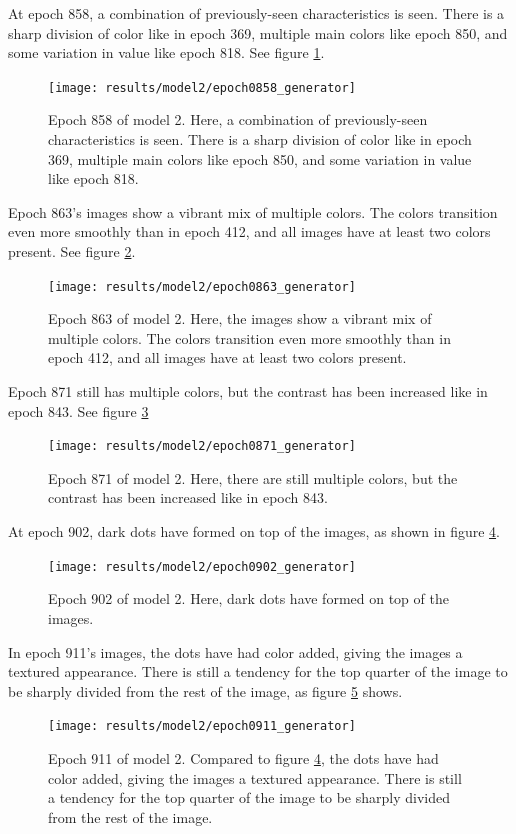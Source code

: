 \documentclass[11pt,letterpaper]{article}
\begin{document}
				At epoch 858, a combination of previously-seen characteristics is seen.
				There is a sharp division of color like in epoch 369, multiple main colors like epoch 850, and some variation in value like epoch 818.
				See figure \ref{fig:cgvg:epoch0858generator}.
				\begin{figure}
					\centering
					\texttt{[image: results/model2/epoch0858\_generator]}
					\caption{Epoch 858 of model 2. Here, a combination of previously-seen characteristics is seen. There is a sharp division of color like in epoch 369, multiple main colors like epoch 850, and some variation in value like epoch 818.}
					\label{fig:cgvg:epoch0858generator}
				\end{figure}

				Epoch 863's images show a vibrant mix of multiple colors.
				The colors transition even more smoothly than in epoch 412, and all images have at least two colors present.
				See figure \ref{fig:cgvg:epoch0863generator}.
				\begin{figure}
					\centering
					\texttt{[image: results/model2/epoch0863\_generator]}
					\caption{Epoch 863 of model 2. Here, the images show a vibrant mix of multiple colors. The colors transition even more smoothly than in epoch 412, and all images have at least two colors present.}
					\label{fig:cgvg:epoch0863generator}
				\end{figure}

				Epoch 871 still has multiple colors, but the contrast has been increased like in epoch 843.
				See figure \ref{fig:cgvg:epoch0871generator}
				\begin{figure}
					\centering
					\texttt{[image: results/model2/epoch0871\_generator]}
					\caption{Epoch 871 of model 2. Here, there are still multiple colors, but the contrast has been increased like in epoch 843.}
					\label{fig:cgvg:epoch0871generator}
				\end{figure}

				At epoch 902, dark dots have formed on top of the images, as shown in figure \ref{fig:cgvg:epoch0902generator}.
				\begin{figure}
					\centering
					\texttt{[image: results/model2/epoch0902\_generator]}
					\caption{Epoch 902 of model 2. Here, dark dots have formed on top of the images.}
					\label{fig:cgvg:epoch0902generator}
				\end{figure}

				In epoch 911's images, the dots have had color added, giving the images a textured appearance.
				There is still a tendency for the top quarter of the image to be sharply divided from the rest of the image, as figure \ref{fig:cgvg:epoch0911generator} shows.
				\begin{figure}
					\centering
					\texttt{[image: results/model2/epoch0911\_generator]}
					\caption{Epoch 911 of model 2. Compared to figure \ref{fig:cgvg:epoch0902generator}, the dots have had color added, giving the images a textured appearance. There is still a tendency for the top quarter of the image to be sharply divided from the rest of the image.}
					\label{fig:cgvg:epoch0911generator}
				\end{figure}
\end{document}
